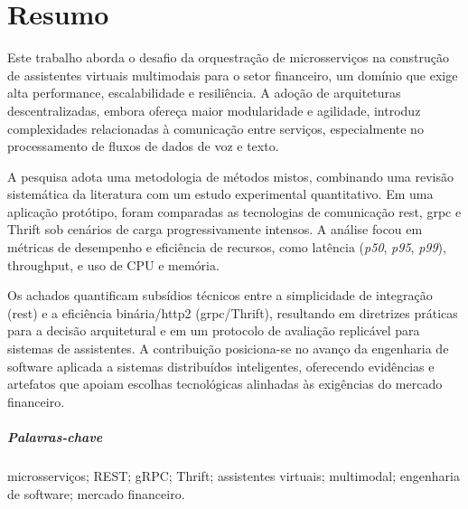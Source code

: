 \chapter*{Resumo}

Este trabalho aborda o desafio da orquestração de microsserviços na construção de assistentes virtuais multimodais para o setor financeiro, um domínio que exige alta performance, escalabilidade e resiliência. A adoção de arquiteturas descentralizadas, embora ofereça maior modularidade e agilidade, introduz complexidades relacionadas à comunicação entre serviços, especialmente no processamento de fluxos de dados de voz e texto.

A pesquisa adota uma metodologia de métodos mistos, combinando uma revisão sistemática da literatura com um estudo experimental quantitativo. Em uma aplicação protótipo, foram comparadas as tecnologias de comunicação \gls{rest}, \gls{grpc} e Thrift sob cenários de carga progressivamente intensos. A análise focou em métricas de desempenho e eficiência de recursos, como latência (\textit{p50}, \textit{p95}, \textit{p99}), throughput, e uso de CPU e memória.

Os achados quantificam subsídios técnicos entre a simplicidade de integração (\gls{rest}) e a eficiência binária/\acrshort{http}2 (\acrshort{grpc}/Thrift), resultando em diretrizes práticas para a decisão arquitetural e em um protocolo de avaliação replicável para sistemas de assistentes. A contribuição posiciona-se no avanço da engenharia de software aplicada a sistemas distribuídos inteligentes, oferecendo evidências e artefatos que apoiam escolhas tecnológicas alinhadas às exigências do mercado financeiro.

\paragraph{Palavras-chave} microsserviços; REST; gRPC; Thrift; assistentes virtuais; multimodal; engenharia de software; mercado financeiro.
